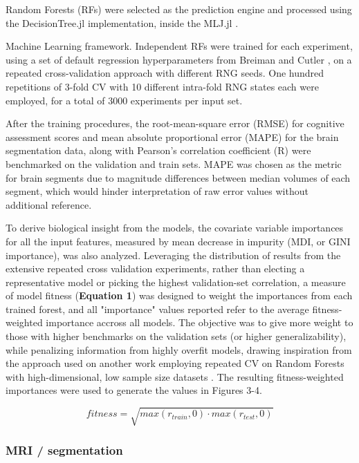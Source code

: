 \documentclass{article}
\begin{document}
Random Forests (RFs)
\cite{breimanRandomForests2001}
were selected as the prediction engine and processed using the
DecisionTree.jl \cite{sadeghiDecisionTreeJlJulia2022}
implementation, inside the MLJ.jl \cite{blaomMLJJuliaPackage2020}.

Machine Learning framework. Independent RFs were trained for each
experiment, using a set of default regression hyperparameters from
Breiman and Cutler \cite{breimanRandomForests2001},
on a repeated cross-validation approach with different RNG seeds. One hundred
repetitions of 3-fold CV with 10 different intra-fold RNG states each
were employed, for a total of 3000 experiments per input set.

After the training procedures, the root-mean-square error (RMSE) for
cognitive assessment scores and mean absolute proportional error (MAPE)
for the brain segmentation data, along with Pearson's
correlation coefficient (R) were benchmarked on the validation and train
sets. MAPE was chosen as the metric for brain segments due to magnitude
differences between median volumes of each segment, which would hinder
interpretation of raw error values without additional reference.

To derive biological insight from the models, the covariate variable
importances for all the input features, measured by mean decrease in
impurity (MDI, or GINI importance), was also analyzed. Leveraging the
distribution of results from the extensive repeated cross validation
experiments, rather than electing a representative model or picking the
highest validation-set correlation, a measure of model fitness
(\textbf{Equation 1}) was designed to weight the importances from each
trained forest, and all "importance" values reported refer to 
the average fitness-weighted importance accross all models.
The objective was to give more weight to those with
higher benchmarks on the validation sets (or higher generalizability),
while penalizing information from highly overfit models, drawing
inspiration from the approach used on another work employing repeated CV
on Random Forests with high-dimensional, low sample size
datasets \cite{woodruffInflammationAutoreactivityDefine2022}.
The resulting fitness-weighted importances were used
to generate the values in Figures 3-4.

\begin{equation}
    fitness = \sqrt{max(r_{train}, 0) \cdot max(r_{test}, 0)}
\end{equation}


\subsubsection*{MRI / segmentation}
\end{document}
